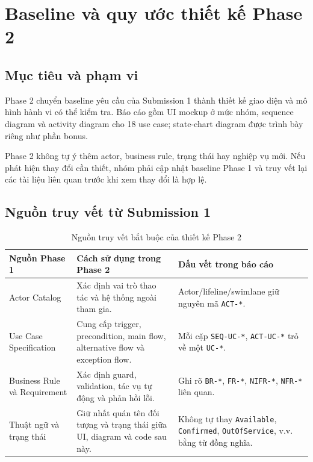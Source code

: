 \section{Baseline và quy ước thiết kế Phase 2}

\subsection{Mục tiêu và phạm vi}

Phase 2 chuyển baseline yêu cầu của Submission 1 thành thiết kế giao diện và mô hình hành vi có thể kiểm tra. Báo cáo gồm UI mockup ở mức nhóm, sequence diagram và activity diagram cho 18 use case; state-chart diagram được trình bày riêng như phần bonus.

Phase 2 không tự ý thêm actor, business rule, trạng thái hay nghiệp vụ mới. Nếu phát hiện thay đổi cần thiết, nhóm phải cập nhật baseline Phase 1 và truy vết lại các tài liệu liên quan trước khi xem thay đổi là hợp lệ.

\subsection{Nguồn truy vết từ Submission 1}

\begin{table}[htbp]
  \centering
  \caption{Nguồn truy vết bắt buộc của thiết kế Phase 2}
  \begin{tabularx}{\textwidth}{|L{34mm}|Y|Y|}
    \hline
    \textbf{Nguồn Phase 1} & \textbf{Cách sử dụng trong Phase 2} & \textbf{Dấu vết trong báo cáo}\\\hline
    Actor Catalog & Xác định vai trò thao tác và hệ thống ngoài tham gia. & Actor/lifeline/swimlane giữ nguyên mã \texttt{ACT-*}.\\\hline
    Use Case Specification & Cung cấp trigger, precondition, main flow, alternative flow và exception flow. & Mỗi cặp \texttt{SEQ-UC-*}, \texttt{ACT-UC-*} trỏ về một \texttt{UC-*}.\\\hline
    Business Rule và Requirement & Xác định guard, validation, tác vụ tự động và phản hồi lỗi. & Ghi rõ \texttt{BR-*}, \texttt{FR-*}, \texttt{NIFR-*}, \texttt{NFR-*} liên quan.\\\hline
    Thuật ngữ và trạng thái & Giữ nhất quán tên đối tượng và trạng thái giữa UI, diagram và code sau này. & Không tự thay \texttt{Available}, \texttt{Confirmed}, \texttt{OutOfService}, v.v. bằng từ đồng nghĩa.\\\hline
  \end{tabularx}
\end{table}

